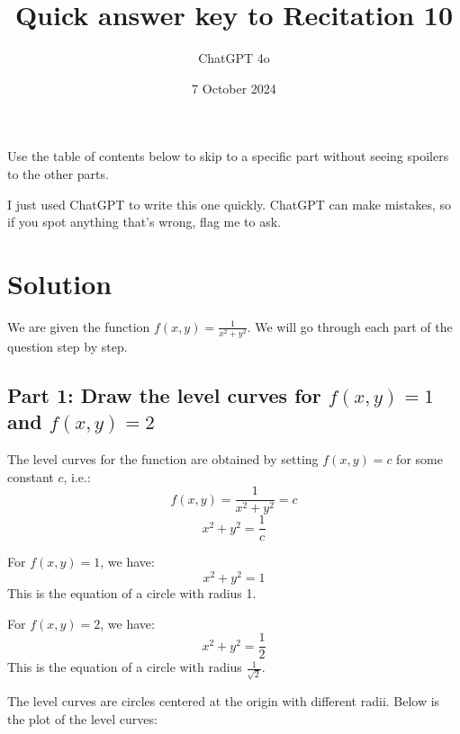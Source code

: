\documentclass[11pt]{article}
\begin{document}
\title{Quick answer key to Recitation 10}
\author{ChatGPT 4o}
\date{7 October 2024}
\maketitle

Use the table of contents below to skip to a specific part
without seeing spoilers to the other parts.

I just used ChatGPT to write this one quickly.
ChatGPT can make mistakes, so if you spot anything that's wrong, flag me to ask.

\tableofcontents



\newpage

\section{Solution}

We are given the function \( f(x, y) = \frac{1}{x^2 + y^2} \). We will go through each part of the question step by step.

\subsection{Part 1: Draw the level curves for \( f(x, y) = 1 \) and \( f(x, y) = 2 \)}

The level curves for the function are obtained by setting \( f(x, y) = c \) for some constant \( c \), i.e.:
\[
f(x, y) = \frac{1}{x^2 + y^2} = c
\]
\[
x^2 + y^2 = \frac{1}{c}
\]

For \( f(x, y) = 1 \), we have:
\[
x^2 + y^2 = 1
\]
This is the equation of a circle with radius 1.

For \( f(x, y) = 2 \), we have:
\[
x^2 + y^2 = \frac{1}{2}
\]
This is the equation of a circle with radius \( \frac{1}{\sqrt{2}} \).

The level curves are circles centered at the origin with different radii. Below is the plot of the level curves:

\begin{center}
\end{center}
\end{document}
